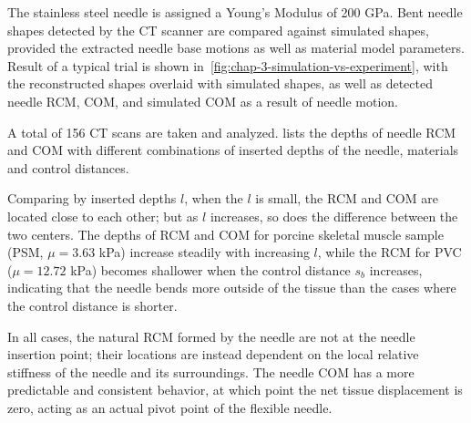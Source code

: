 The stainless steel needle is assigned a Young's Modulus of 200 GPa. Bent needle shapes detected by the CT scanner are compared against simulated shapes, provided the extracted needle base motions as well as material model parameters. Result of a typical trial is shown in~\cref{fig:chap-3-simulation-vs-experiment}, with the reconstructed shapes overlaid with  simulated shapes, as well as detected needle RCM, COM, and simulated COM as a result of needle motion.

A total of 156 CT scans are taken and analyzed.  lists the depths of needle RCM and COM with different combinations of inserted depths of the needle, materials and control distances.

Comparing by inserted depths $l$, when the $l$ is small, the RCM and COM are located close to each other; but as $l$ increases, so does the difference between the two centers. The depths of RCM and COM for porcine skeletal muscle sample (PSM, $\mu = 3.63$ kPa) increase steadily with increasing $l$, while the RCM for PVC ($\mu = 12.72$ kPa) becomes shallower when the control distance $s_b$ increases, indicating that the needle bends more outside of the tissue than the cases where the control distance is shorter.

In all cases, the natural RCM formed by the needle are not at the needle insertion point; their locations are instead dependent on the local relative stiffness of the needle and its surroundings. The needle COM has a more predictable and consistent behavior, at which point the net tissue displacement is zero, acting as an actual pivot point of the flexible needle.

